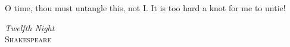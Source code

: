 \documentclass[11pt, a4paper, oneside]{book}
\begin{document}



  

  


\cleardoublepage
\thispagestyle{empty}
\epigraph{O time, thou must untangle this, not I.
It is too hard a knot for me to untie!}
{\textit{Twelfth Night}\\
\textsc{Shakespeare}}




\tableofcontents
\listoffigures
\listoftables












\appendix %




\backmatter %


{}



\end{document}
